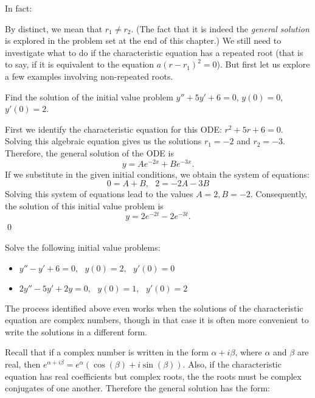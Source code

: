 \documentclass[12pt,letterpaper,twoside]{amsart}
\newcounter{example}
\newcounter{exercise}
\newcounter{problem}
\newcommand{\example}{\bigskip \noindent {\large {\sc Example \arabic{example}:}} \addtocounter{example}{1}}
\newcommand{\exercise}{\bigskip \noindent {\large {\sc Exercise \arabic{exercise}:}} \addtocounter{exercise}{1}}
\begin{document}
In fact:
\begin{center}
\end{center}
By distinct, we mean that $r_1 \neq r_2$.  (The fact that it is indeed the {\it general solution} is explored in the problem set at the end of this chapter.)  We still need to investigate what to do if the characteristic equation has a repeated root (that is to say, if it is equivalent to the equation $a(r-r_1)^2=0$).  But first let us explore a few examples involving non-repeated roots.

\example Find the solution of the initial value problem $y''+5y'+6=0$, $y(0)=0$, $y'(0)=2$.

First we identify the characteristic equation for this ODE: $r^2+5r+6=0$.  Solving this algebraic equation gives us the solutions $r_1=-2$ and $r_2=-3$.  Therefore, the general solution of the ODE is
\[ y=Ae^{-2x}+Be^{-3x}.\]
If we substitute in the given initial conditions, we obtain the system of equations:
\[ 0=A+B, \ \ \ 2 = -2A-3B\]
Solving this system of equations lead to the values $A=2, B=-2$.  Consequently, the solution of this initial value problem is
\[ y = 2e^{-2t}-2e^{-3t}.\]
\qed




\exercise Solve the following initial value problems:
\begin{itemize}
\item $y''-y'+6=0, \ \ \ y(0)=2, \ \ \ y'(0)=0$
\item $2y''-5y'+2y=0, \ \ \ y(0)=1, \ \ \ y'(0)=2$
\end{itemize}

The process identified above even works when the solutions of the characteristic equation are complex numbers, though in that case it is often more convenient to write the solutions in a different form.

Recall that if a complex number is written in the form $\alpha + i \beta$, where $\alpha$ and $\beta$ are real, then $e^{\alpha+i\beta}=e^\alpha(\cos(\beta)+i\sin(\beta))$.  Also, if the characteristic equation has real coefficients but complex roots, the the roots must be complex conjugates of one another.  Therefore the general solution has the form:
\end{document}
